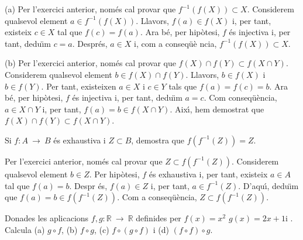 \begin{solucio}
(a) Per l'exercici anterior, nom\'{e}s cal provar que $f^{-1}\left(
f(X)\right) \subset X$. Considerem qualsevol element $a\in f^{-1}\left(
f(X)\right) $. Llavors, $f(a)\in f(X)$ i, per tant, existeix $c\in X$ tal
que $f(c)=f(a)$. Ara b\'{e}, per hip\`{o}tesi, $f$ \'{e}s injectiva i, per
tant, dedu\"{\i}m $c=a$. Despr\'{e}s, $a\in X$ i, com a conseq\"{u}\`{e}%
ncia, $f^{-1}\left( f(X)\right) \subset X$.

(b) Per l'exercici anterior, nom\'{e}s cal provar que $f(X)\cap f(Y)\subset
f(X\cap Y)$. Considerem qualsevol element $b\in f(X)\cap f(Y)$. Llavors, $%
b\in f(X)$ i $b\in f(Y)$. Per tant, existeixen $a\in X$ i $c\in Y$ tals que $%
f(a)=f(c)=b$. Ara b\'{e}, per hip\`{o}tesi, $f$ \'{e}s injectiva i, per
tant, dedu\"{\i}m $a=c$. Com conseq\"{u}\`{e}ncia, $a\in X\cap Y$ i, per
tant, $f(a)=b\in f(X\cap Y)$. Aix\'{\i}, hem demostrat que $f(X)\cap
f(Y)\subset f(X\cap Y)$.
\end{solucio}

\begin{exer}
Si $f:A~\longrightarrow ~B$ \'{e}s exhaustiva i $Z\subset B$, demostra que $%
f\left( f^{-1}(Z)\right) =Z$.
\end{exer}

\begin{solucio}
Per l'exercici anterior, nom\'{e}s cal provar que $Z\subset f\left(
f^{-1}(Z)\right) $. Considerem qualsevol element $b\in Z$. Per hip\`{o}tesi,
$f$ \'{e}s exhaustiva i, per tant, existeix $a\in A$ tal que $f(a)=b$. Despr%
\'{e}s, $f(a)\in Z$ i, per tant, $a\in f^{-1}(Z)$. D'aqu\'{\i}, dedu\"{\i}m
que $f(a)=b\in f\left( f^{-1}(Z)\right) $. Com a conseq\"{u}\`{e}ncia, $%
Z\subset f\left( f^{-1}(Z)\right) $.
\end{solucio}

\begin{exer}
Donades les aplicacions $f,g:\mathbb{R}~\longrightarrow ~\mathbb{R}$
definides per $f(x)=x^{2}$ $g(x)=2x+1$i . Calcula (a) $g\circ f$, (b) $%
f\circ g$, (c) $f\circ (g\circ f)$ i (d) $(f\circ f)\circ g$.
\end{exer}

